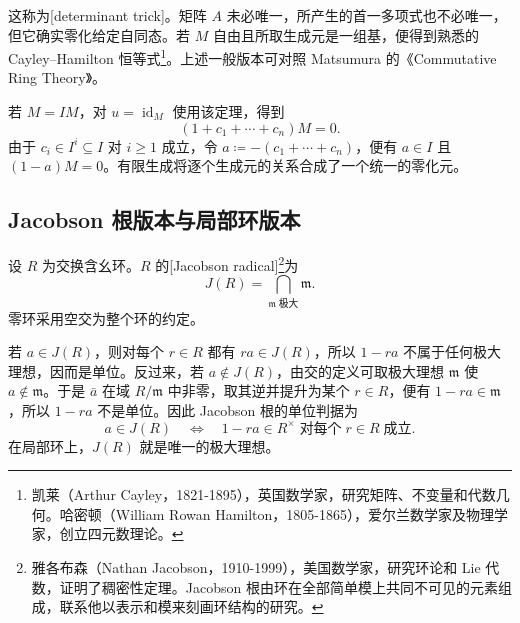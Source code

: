 这称为[determinant trick]。矩阵 \(A\) 未必唯一，所产生的首一多项式也不必唯一，但它确实零化给定自同态。若 \(M\) 自由且所取生成元是一组基，便得到熟悉的 Cayley–Hamilton 恒等式\footnote{凯莱（Arthur Cayley，1821-1895），英国数学家，研究矩阵、不变量和代数几何。哈密顿（William Rowan Hamilton，1805-1865），爱尔兰数学家及物理学家，创立四元数理论。}。上述一般版本可对照 Matsumura 的《Commutative Ring Theory》\cite[Theorem 2.1, pp. 7--8]{Matsumura1989CommutativeRingTheory}。

\ProseParagraphBreak
若 \(M=IM\)，对 \(u=\operatorname{id}_M\) 使用该定理，得到
\[
	(1+c_1+\cdots+c_n)M=0.
\]
由于 \(c_i\in I^i\subseteq I\) 对 \(i\ge1\) 成立，令 \(a\coloneqq-(c_1+\cdots+c_n)\)，便有 \(a\in I\) 且 \((1-a)M=0\)。有限生成将逐个生成元的关系合成了一个统一的零化元。

\subsection{Jacobson 根版本与局部环版本}
\label{b3:subsec:0302:02}

\begin{definition}\label{b3:def:jacobson-radical}
	设 \(R\) 为交换含幺环。\(R\) 的[Jacobson radical]\footnote{雅各布森（Nathan Jacobson，1910-1999），美国数学家，研究环论和 Lie 代数，证明了稠密性定理。Jacobson 根由环在全部简单模上共同不可见的元素组成，联系他以表示和模来刻画环结构的研究。}为
	\[
		J(R)=\bigcap_{\mathfrak m\;\text{极大}}\mathfrak m.
	\]
	零环采用空交为整个环的约定。
\end{definition}

若 \(a\in J(R)\)，则对每个 \(r\in R\) 都有 \(ra\in J(R)\)，所以 \(1-ra\) 不属于任何极大理想，因而是单位。反过来，若 \(a\notin J(R)\)，由交的定义可取极大理想 \(\mathfrak m\) 使 \(a\notin\mathfrak m\)。于是 \(\bar a\) 在域 \(R/\mathfrak m\) 中非零，取其逆并提升为某个 \(r\in R\)，便有 \(1-ra\in\mathfrak m\)，所以 \(1-ra\) 不是单位。因此 Jacobson 根的单位判据为
\[
	a\in J(R)\quad\Longleftrightarrow\quad 1-ra\in R^\times\;\text{对每个}\;r\in R\;\text{成立}.
\]
在局部环上，\(J(R)\) 就是唯一的极大理想。

